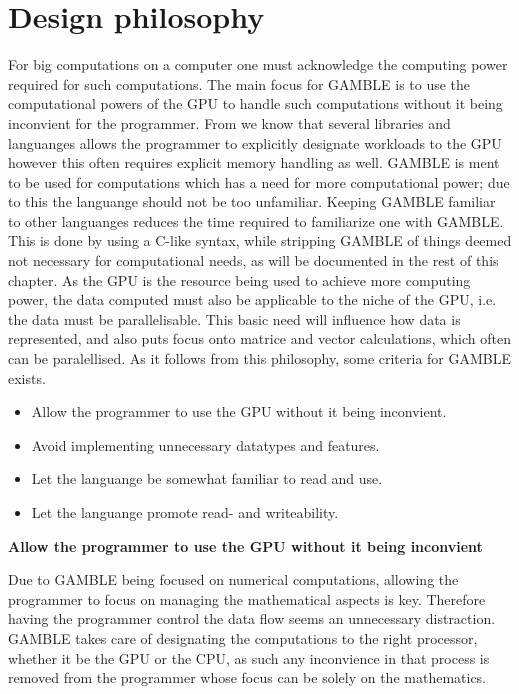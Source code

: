 \section{Design philosophy}
For big computations on a computer one must acknowledge the computing power required for such computations.
The main focus for GAMBLE is to use the computational powers of the GPU to handle such computations without it being inconvient for the programmer.
From  we know that several libraries and languanges allows the programmer to explicitly designate workloads to the GPU however this often requires explicit memory handling as well.
GAMBLE is ment to be used for computations which has a need for more computational power; due to this the languange should not be too unfamiliar.
Keeping GAMBLE familiar to other languanges reduces the time required to familiarize one with GAMBLE.
This is done by using a C-like syntax, while stripping GAMBLE of things deemed not necessary for computational needs, as will be documented in the rest of this chapter.
As the GPU is the resource being used to achieve more computing power, the data computed must also be applicable to the niche of the GPU, i.e. the data must be parallelisable.
This basic need will influence how data is represented, and also puts focus onto matrice and vector calculations, which often can be paralellised.
As it follows from this philosophy, some criteria for GAMBLE exists.
\begin{itemize}
	\item Allow the programmer to use the GPU without it being inconvient.
	\item Avoid implementing unnecessary datatypes and features.
	\item Let the languange be somewhat familiar to read and use.
	\item Let the languange promote read- and writeability.
\end{itemize}

\textbf{Allow the programmer to use the GPU without it being inconvient}

Due to GAMBLE being focused on numerical computations, allowing the programmer to focus on managing the mathematical aspects is key.
Therefore having the programmer control the data flow seems an unnecessary distraction.
GAMBLE takes care of designating the computations to the right processor, whether it be the GPU or the CPU, as such any inconvience in that process is removed from the programmer whose focus can be solely on the mathematics.

